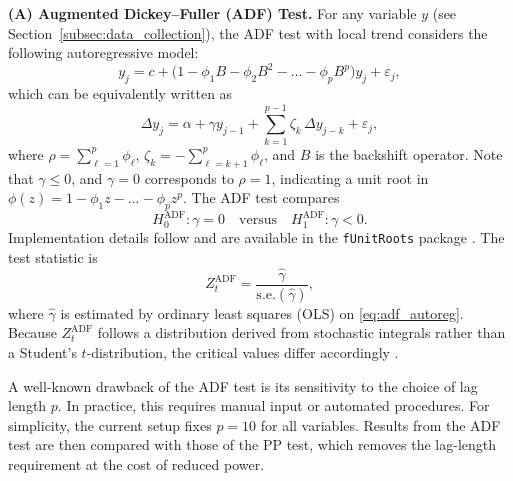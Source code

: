 \documentclass[10pt,a4paper,oneside]{article}
\begin{document}
\noindent \textbf{(A) Augmented Dickey--Fuller (ADF) Test.}
For any variable \(y\) (see Section~\ref{subsec:data_collection}), the ADF test with local trend considers the following autoregressive model:
\[
y_j 
= 
c + \bigl(1 - \phi_1 B - \phi_2 B^2 - \dots - \phi_p B^p\bigr) y_j 
+ 
\varepsilon_j,
\]
which can be equivalently written as
\begin{equation}
\Delta y_j 
= 
\alpha + \gamma y_{j - 1} 
+ 
\sum_{k = 1}^{p - 1} \zeta_k \,\Delta y_{j - k} 
+ 
\varepsilon_j,
\label{eq:adf_autoreg}
\end{equation}
where \(\rho = \sum_{\ell=1}^{p}\phi_\ell\), \(\zeta_k = -\sum_{\ell=k+1}^{p}\phi_\ell\), and \(B\) is the backshift operator. Note that \(\gamma \le 0\), and \(\gamma = 0\) corresponds to \(\rho = 1\), indicating a unit root in \(\phi(z) = 1 - \phi_1 z - \dots - \phi_p z^p\). The ADF test compares
\[
H_0^{\text{ADF}}: \gamma = 0 
\quad \text{versus} \quad
H_1^{\text{ADF}}: \gamma < 0.
\]
Implementation details follow \cite{banerjee1993co} and are available in the \verb|fUnitRoots| package \cite{funitroots2024}. The test statistic is
\[
Z^{\text{ADF}}_t 
= 
\frac{\hat{\gamma}}{\text{s.e.}(\hat{\gamma})},
\]
where \(\hat{\gamma}\) is estimated by ordinary least squares (OLS) on \eqref{eq:adf_autoreg}. Because \(Z^{\text{ADF}}_t\) follows a distribution derived from stochastic integrals rather than a Student’s \(t\)-distribution, the critical values differ accordingly \cite{banerjee1993co}.

A well-known drawback of the ADF test is its sensitivity to the choice of lag length \(p\). In practice, this requires manual input or automated procedures. For simplicity, the current setup fixes \(p = 10\) for all variables. Results from the ADF test are then compared with those of the PP test, which removes the lag-length requirement at the cost of reduced power.
\end{document}
